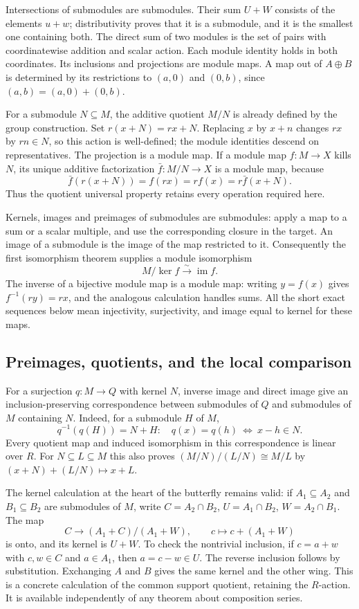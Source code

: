 \documentclass[11pt]{article}
\theoremstyle{definition}
\theoremstyle{remark}\newtheorem{remark}[theorem]{Remark}
\newcommand{\iso}{\xrightarrow{\sim}}
\DeclareMathOperator{\Ker}{ker}
\DeclareMathOperator{\im}{im}
\begin{document}
Intersections of submodules are submodules. Their sum $U+W$ consists of
the elements $u+w$; distributivity proves that it is a submodule, and it
is the smallest one containing both. The direct sum of two modules is
the set of pairs with coordinatewise addition and scalar action. Each
module identity holds in both coordinates. Its inclusions and projections
are module maps. A map out of $A\oplus B$ is determined by its restrictions
to $(a,0)$ and $(0,b)$, since $(a,b)=(a,0)+(0,b)$.

For a submodule $N\subseteq M$, the additive quotient $M/N$ is already
defined by the group construction. Set $r(x+N)=rx+N$. Replacing $x$ by
$x+n$ changes $rx$ by $rn\in N$, so this action is well-defined;
the module identities descend on representatives. The projection is a
module map. If a module map $f:M\to X$ kills $N$, its unique additive
factorization $\bar f:M/N\to X$ is a module map, because
\[
 \bar f(r(x+N))=f(rx)=rf(x)=r\bar f(x+N).
\]
Thus the quotient universal property retains every operation required here.

Kernels, images and preimages of submodules are submodules: apply a map
to a sum or a scalar multiple, and use the corresponding closure in the
target. An image of a submodule is the image of the map restricted to it.
Consequently the first isomorphism theorem supplies a module isomorphism
\[
 M/\Ker f\iso\im f.
\]
The inverse of a bijective module map is a module map: writing $y=f(x)$
gives $f^{-1}(ry)=rx$, and the analogous calculation handles sums.
All the short exact sequences below mean injectivity, surjectivity, and
image equal to kernel for these maps.

\subsection{Preimages, quotients, and the local comparison}

For a surjection $q:M\to Q$ with kernel $N$, inverse image and direct
image give an inclusion-preserving correspondence
between submodules of $Q$ and submodules of $M$ containing $N$.
Indeed, for a submodule $H$ of $M$,
\[
 q^{-1}(q(H))=N+H:
 \quad q(x)=q(h)\ \Longleftrightarrow\ x-h\in N.
\]
Every quotient map and induced isomorphism in this correspondence is
linear over $R$. For $N\subseteq L\subseteq M$ this also proves
$(M/N)/(L/N)\cong M/L$ by $(x+N)+(L/N)\mapsto x+L$.

The kernel calculation at the heart of the butterfly remains valid:
if $A_1\subseteq A_2$ and $B_1\subseteq B_2$ are submodules of $M$,
write $C=A_2\cap B_2$, $U=A_1\cap B_2$, $W=A_2\cap B_1$.
The map
\[
 C\longrightarrow (A_1+C)/(A_1+W),\qquad c\longmapsto c+(A_1+W)
\]
is onto, and its kernel is $U+W$. To check the nontrivial inclusion,
if $c=a+w$ with $c,w\in C$ and $a\in A_1$, then $a=c-w\in U$.
The reverse inclusion follows by substitution. Exchanging $A$ and $B$
gives the same kernel and the other wing. This is a concrete calculation
of the common support quotient, retaining the $R$-action. It is available independently
of any theorem about composition series.
\end{document}
